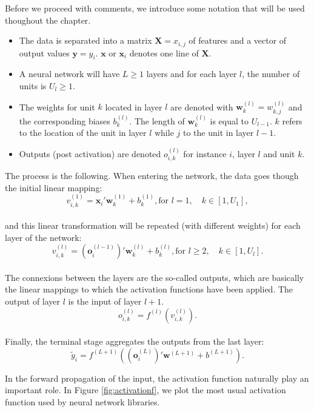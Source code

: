 \documentclass[]{krantz}
\providecommand{\tightlist}{%
  \setlength{\itemsep}{0pt}\setlength{\parskip}{0pt}}
\theoremstyle{definition}
\theoremstyle{definition}
\theoremstyle{definition}
\theoremstyle{remark}
\begin{document}
Before we proceed with comments, we introduce some notation that will be
used thoughout the chapter.

\begin{itemize}
\tightlist
\item
  The data is separated into a matrix \(\textbf{X}=x_{i,j}\) of features
  and a vector of output values \(\textbf{y}=y_i\). \(\textbf{x}\) or
  \(\textbf{x}_i\) denotes one line of \(\textbf{X}\).
\item
  A neural network will have \(L\ge1\) layers and for each layer \(l\),
  the number of units is \(U_l\ge1\).
\item
  The weights for unit \(k\) located in layer \(l\) are denoted with
  \(\textbf{w}_{k}^{(l)}=w_{k,j}^{(l)}\) and the corresponding biases
  \(b_{k}^{(l)}\). The length of \(\textbf{w}_{k}^{(l)}\) is equal to
  \(U_{l-1}\). \(k\) refers to the location of the unit in layer \(l\)
  while \(j\) to the unit in layer \(l-1\).
\item
  Outputs (post activation) are denoted \(o_{i,k}^{(l)}\) for instance
  \(i\), layer \(l\) and unit \(k\).
\end{itemize}

The process is the following. When entering the network, the data goes
though the initial linear mapping:\\
\[v_{i,k}^{(1)}=\textbf{x}_i'\textbf{w}^{(1)}_k+b_k^{(1)},  \text{for } l=1, \quad k \in [1,U_1],  \]\\
and this linear transformation will be repeated (with different weights)
for each layer of the network:
\[v_{i,k}^{(l)}=(\textbf{o}^{(l-1)}_i)'\textbf{w}^{(l)}_k+b_k^{(l)}, \text{for } l \ge 2,  \quad k \in [1,U_l]. \]\\
The connexions between the layers are the so-called outputs, which are
basically the linear mappings to which the activation functions have
been applied. The output of layer \(l\) is the input of layer \(l+1\).
\[o_{i,k}^{(l)}=f^{(l)}\left(v_{i,k}^{(l)}\right).\]\\
Finally, the terminal stage aggregates the outputs from the last
layer:\\
\[\tilde{y}_i =f^{(L+1)} \left((\textbf{o}^{(L)}_i)'\textbf{w}^{(L+1)}+b^{(L+1)}\right).\]

In the forward propagation of the input, the activation function
naturally play an important role. In Figure \ref{fig:activationf}, we
plot the most usual activation function used by neural network
libraries.
\end{document}
